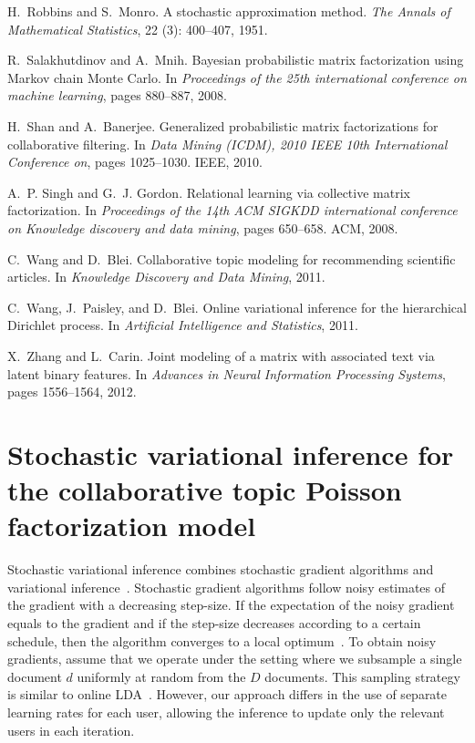 \documentclass{article}
\begin{document}
{\begin{thebibliography}{25}
H.~Robbins and S.~Monro.
\newblock A stochastic approximation method.
\newblock \emph{The Annals of Mathematical Statistics}, 22
  (3): 400--407, 1951.

R.~Salakhutdinov and A.~Mnih.
\newblock Bayesian probabilistic matrix factorization using {M}arkov chain
  {M}onte {C}arlo.
\newblock In \emph{Proceedings of the 25th international conference on machine
  learning}, pages 880--887, 2008.

H.~Shan and A.~Banerjee.
\newblock Generalized probabilistic matrix factorizations for collaborative
  filtering.
\newblock In \emph{Data Mining (ICDM), 2010 IEEE 10th International Conference
  on}, pages 1025--1030. IEEE, 2010.

A.~P. Singh and G.~J. Gordon.
\newblock Relational learning via collective matrix factorization.
\newblock In \emph{Proceedings of the 14th ACM SIGKDD international conference
  on Knowledge discovery and data mining}, pages 650--658. ACM, 2008.

C.~Wang and D.~Blei.
\newblock Collaborative topic modeling for recommending scientific articles.
\newblock In \emph{Knowledge Discovery and Data Mining}, 2011.

C.~Wang, J.~Paisley, and D.~Blei.
\newblock Online variational inference for the hierarchical {D}irichlet
  process.
\newblock In \emph{Artificial Intelligence and Statistics}, 2011.

X.~Zhang and L.~Carin.
\newblock Joint modeling of a matrix with associated text via latent binary
  features.
\newblock In \emph{Advances in Neural Information Processing Systems}, pages
  1556--1564, 2012.

\end{thebibliography}

}

\section{Stochastic variational inference for the collaborative topic Poisson
  factorization model}
Stochastic variational inference combines stochastic gradient algorithms and
variational inference~\cite{Hoffman:2013}. Stochastic gradient algorithms
follow noisy estimates of the gradient with a decreasing step-size. If the
expectation of the noisy gradient equals to the gradient and if the step-size
decreases according to a certain schedule, then the algorithm converges to a
local optimum~\cite{Robbins:1951}. To obtain noisy gradients, assume that we
operate under the setting where we subsample a single document $d$ uniformly at
random from the $D$ documents. This sampling strategy is similar to online
LDA~\cite{Hoffman:2010a}. However, our approach differs in the use of separate
learning rates for each user, allowing the inference to update only the
relevant users in each iteration.
\end{document}
